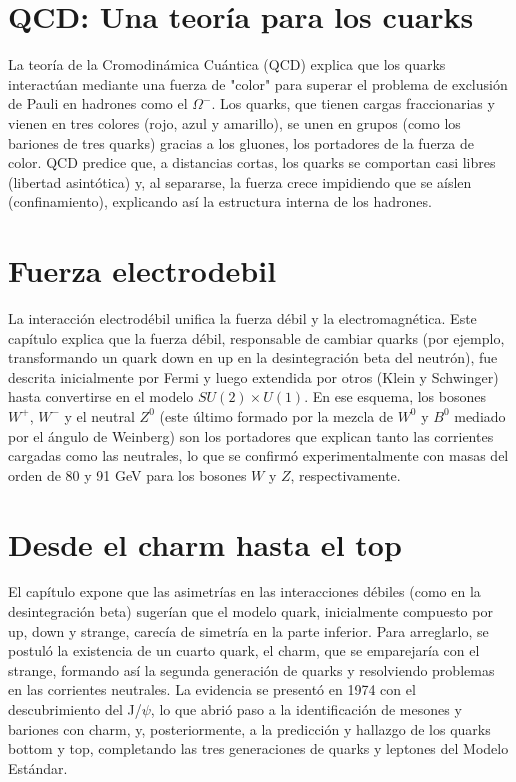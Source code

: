 \documentclass[12pt]{article}
\begin{document}
\section{QCD: Una teoría para los cuarks}
La teoría de la Cromodinámica Cuántica (QCD) explica que los quarks interactúan mediante una fuerza de "color" para superar el problema de exclusión de Pauli en hadrones como el $\Omega^{-}$. Los quarks, que tienen cargas fraccionarias y vienen en tres colores (rojo, azul y amarillo), se unen en grupos (como los bariones de tres quarks) gracias a los gluones, los portadores de la fuerza de color. QCD predice que, a distancias cortas, los quarks se comportan casi libres (libertad asintótica) y, al separarse, la fuerza crece impidiendo que se aíslen (confinamiento), explicando así la estructura interna de los hadrones.

\section{Fuerza electrodebil}
La interacción electrodébil unifica la fuerza débil y la electromagnética. Este capítulo explica que la fuerza débil, responsable de cambiar quarks (por ejemplo, transformando un quark down en up en la desintegración beta del neutrón), fue descrita inicialmente por Fermi y luego extendida por otros (Klein y Schwinger) hasta convertirse en el modelo $SU(2)\times U(1)$. En ese esquema, los bosones $W^{+}$, $W^{-}$ y el neutral $Z^{0}$ (este último formado por la mezcla de $W^{0}$ y $B^{0}$ mediado por el ángulo de Weinberg) son los portadores que explican tanto las corrientes cargadas como las neutrales, lo que se confirmó experimentalmente con masas del orden de 80 y 91 GeV para los bosones $W$ y $Z$, respectivamente.

\section{Desde el charm hasta el top}

El capítulo expone que las asimetrías en las interacciones débiles (como en la desintegración beta) sugerían que el modelo quark, inicialmente compuesto por up, down y strange, carecía de simetría en la parte inferior. Para arreglarlo, se postuló la existencia de un cuarto quark, el charm, que se emparejaría con el strange, formando así la segunda generación de quarks y resolviendo problemas en las corrientes neutrales. La evidencia se presentó en 1974 con el descubrimiento del J/$\psi$, lo que abrió paso a la identificación de mesones y bariones con charm, y, posteriormente, a la predicción y hallazgo de los quarks bottom y top, completando las tres generaciones de quarks y leptones del Modelo Estándar.
\end{document}
